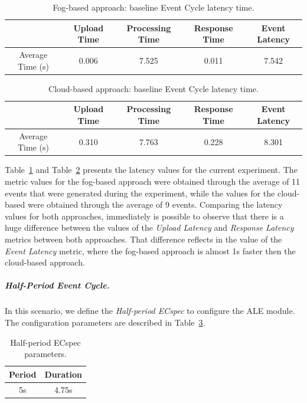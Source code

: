 \begin{table}[ht!]
  \begin{tabular}{|c|c|c|c|c|}
  \hline
  ~                & Upload Time & Processing Time & Response Time & Event Latency \\ \hline
  Average Time (s) & 0.006       & 7.525           & 0.011         & 7.542         \\ \hline
  \end{tabular}
  \caption{Fog-based approach: baseline Event Cycle latency time.}
  \label{table:ecspec_local}
\end{table}

\begin{table}[ht!]
  \begin{tabular}{|c|c|c|c|c|}
  \hline
  ~                & Upload Time & Processing Time & Response Time & Event Latency \\ \hline
  Average Time (s) & 0.310       & 7.763           & 0.228         &  8.301        \\ \hline
  \end{tabular}
  \caption{Cloud-based approach: baseline Event Cycle latency time.}
  \label{table:ecspec_cloud}
\end{table}

Table~\ref{table:ecspec_local} and Table~\ref{table:ecspec_cloud} presents the latency values for the
current experiment. The metric values for the fog-based approach were obtained through the average
of 11 events that were generated during the experiment, while the values for the cloud-based were
obtained through the average of 9 events. Comparing the latency values for both approaches,
immediately is possible to observe that there is a huge difference between the values of the
\textit{Upload Latency} and \textit{Response Latency} metrics between both approaches. That
difference reflects in the value of the \textit{Event Latency} metric, where the fog-based approach
is almost 1s faster then the cloud-based approach.

\subparagraph{Half-Period Event Cycle.}
\label{subp:eval_exp_latency_ecspec_fast}
In this scenario, we define the \textit{Half-period ECspec} to configure the \gls{ALE} module.
The configuration parameters are described in Table~\ref{table:ecspec_fast}.

\begin{table}[ht!]
  \begin{tabular}{|c|c|}
    \hline
    Period & Duration \\ \hline
    5s    & 4.75s     \\ \hline
  \end{tabular}
  \caption{Half-period ECspec parameters.}
  \label{table:ecspec_fast}
\end{table}

